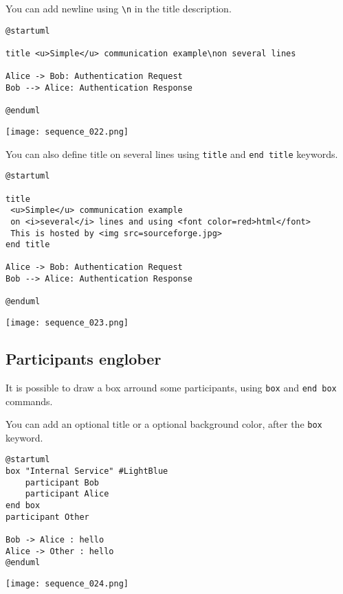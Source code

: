 You can add newline using \texttt{\textbackslash n} in the title description.
\begin{lstlisting}
@startuml

title <u>Simple</u> communication example\non several lines

Alice -> Bob: Authentication Request
Bob --> Alice: Authentication Response

@enduml
\end{lstlisting}
\begin{center}
\texttt{[image: sequence\_022.png]}
\end{center}

\newpage
You can also define title on several lines using \texttt{title} and
\texttt{end title} keywords.
\begin{lstlisting}
@startuml

title
 <u>Simple</u> communication example
 on <i>several</i> lines and using <font color=red>html</font>
 This is hosted by <img src=sourceforge.jpg>
end title

Alice -> Bob: Authentication Request
Bob --> Alice: Authentication Response

@enduml
\end{lstlisting}
\begin{center}
\texttt{[image: sequence\_023.png]}
\end{center}

\newpage \subsection{Participants englober}

\begin{description}
\item
It is possible to draw a box arround some participants, using \texttt{box} and
\texttt{end box} commands.
\item
\item You can add an optional title or a optional
background color, after the \texttt{box} keyword.
\end{description}

\begin{lstlisting}
@startuml
box "Internal Service" #LightBlue
	participant Bob
	participant Alice
end box
participant Other

Bob -> Alice : hello
Alice -> Other : hello
@enduml
\end{lstlisting}
\begin{center}
\texttt{[image: sequence\_024.png]}
\end{center}


